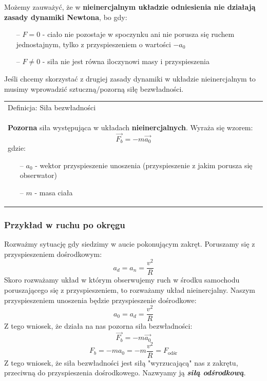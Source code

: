 \documentclass[a4paper]{article}
\newenvironment{definition}[2][Definicja]
    {
        \begin{center}
        \begin{tabular}{|p{1\textwidth}|}
        \hline
            #1: #2\\[2ex]
        \begin{em}
        \Large
    }
    { 
        \end{em}
        \\\hline
        \end{tabular} 
        \end{center}
    }
\begin{document}
    Możemy zauważyć, że w \textbf{nieinercjalnym układzie odniesienia nie działają zasady dynamiki Newtona}, bo gdy:
    \begin{itemize}
        \item[--] $F = 0$ - ciało nie pozostaje w spoczynku ani nie porusza się ruchem jednostajnym, 
        tylko z przyspieszeniem o wartości $-a_0$
        \item[--] $F \neq 0$ - siła nie jest równa iloczynowi masy i przyspieszenia
    \end{itemize}
    Jeśli chcemy skorzystać z drugiej zasady dynamiki w układzie nieinercjalnym to musimy wprowadzić sztuczną/pozorną 
    siłę bezwładności.
    \begin{definition}{Siła bezwładności}
        \textbf{Pozorna} siła występująca w układach \textbf{nieinercjalnych}. Wyraża się wzorem:
        \[\vec{F_b} = -m\vec{a_0}\]
        gdzie:
        \begin{itemize}
            \item[--] $a_0$ - wektor przyspieszenie unoszenia (przyspieszenie z jakim porusza się obserwator)
            \item[--] $m$ - masa ciała
        \end{itemize}
    \end{definition}
    \subsubsection*{\Large Przykład w ruchu po okręgu}
    Rozważmy sytuację gdy siedzimy w aucie pokonującym zakręt. Poruszamy się z przyspieszeniem dośrodkowym:
    \[a_d = a_n = \frac{v^2}{R}\]
    Skoro rozważamy układ w którym obserwujemy ruch w środku samochodu poruszającego się z przyspieszeniem,
    to rozważamy układ nieinercjalny. Naszym przyspieszeniem unoszenia będzie przyspieszenie dośrodkowe:
    \[a_0 = a_d = \frac{v^2}{R}\]
    Z tego wniosek, że działa na nas pozorna siła bezwładności:
    \[\vec{F_b} = -m\vec{a_0}\]
    \[F_b = -ma_0 = -m\frac{v^2}{R} = F_{\text{odśr}}\] 
    Z tego wniosek, że siła bezwładności jest siłą "wyrzucającą" nas z zakrętu, przeciwną do przyspieszenia
    dośrodkowego. Nazwyamy ją \textbf{\em{siłą odśrodkową}}.
\end{document}
